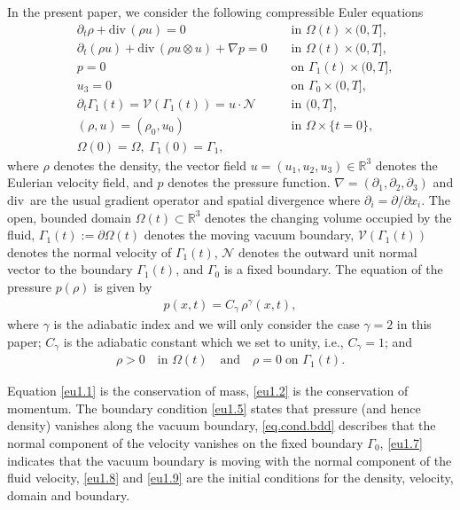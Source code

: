 \documentclass[12pt,twoside,reqno]{amsart}
\numberwithin{equation}{section}
\theoremstyle{definition}
\theoremstyle{remark}
\begin{document}
In the present paper, we consider the following compressible Euler  equations
\begin{subequations}\label{eu1}
  \begin{align}
    &{\partial}_t\rho+{\mathrm{div}\,}(\rho u)=0  &&\text{ in } \Omega(t)\times(0,T],\label{eu1.1}\\
    &{\partial}_t(\rho u)+ {\mathrm{div}\,}(\rho u\otimes u)+{\nabla} p=0  &&\text{ in } \Omega(t)\times(0,T], \label{eu1.2}\\
    &p=0\; &&\text{ on } {\Gamma_1}(t)\times(0,T],\label{eu1.5}\\
    &u_3=0\; &&\text{ on } {\Gamma_0}\times(0,T],\label{eq.cond.bdd}\\
    &\partial_t {\Gamma_1}(t)=\mathcal{V}({\Gamma_1}(t))=u\cdot {\mathcal{N}} &&\text{ in } (0,T],\label{eu1.7}\\
    &(\rho,u)=({\rho_0},u_0) &&\text{ in } \Omega\times\{t=0\} ,\label{eu1.8}\\
    &\Omega(0)=\Omega,\; {\Gamma_1}(0)={\Gamma_1},\label{eu1.9}
\end{align}
\end{subequations}
where $\rho$ denotes the density, the vector field $u=(u_1,u_2,u_3)\in{\mathbb R}^3$ denotes the Eulerian velocity field, and $p$ denotes the pressure function. ${\nabla}=({\partial}_1,{\partial}_2,{\partial}_3)$ and ${\mathrm{div}\,}$ are the usual gradient operator and spatial divergence where ${\partial}_i={\partial}/{\partial} x_i$. The open, bounded domain $\Omega(t)\subset {\mathbb R}^3$ denotes the changing volume occupied by the fluid, ${\Gamma_1}(t):={\partial}\Omega(t)$ denotes the moving vacuum boundary, $\mathcal{V}({\Gamma_1}(t))$ denotes the normal velocity of ${\Gamma_1}(t)$,  ${\mathcal{N}}$ denotes the outward unit normal vector to the boundary ${\Gamma_1}(t)$, and $\Gamma_0$ is a fixed boundary. The equation of the pressure $p(\rho)$ is given by
\begin{align}
  p(x,t)=C_\gamma\, \rho^\gamma(x,t),
\end{align}
where $\gamma$ is the adiabatic index and we will only consider the case $\gamma=2$ in this paper;  $C_\gamma$ is the adiabatic constant which we set to unity, i.e., $C_\gamma=1$; and
\begin{align}
  \rho>0 \quad \text{in } \Omega(t) \quad \text{and}\quad \rho=0 \; \text{on } {\Gamma_1}(t).
\end{align}

Equation \eqref{eu1.1} is the conservation of mass, \eqref{eu1.2} is the conservation of momentum. The boundary condition \eqref{eu1.5} states that pressure (and hence density) vanishes along the vacuum boundary, \eqref{eq.cond.bdd} describes that the normal component of the velocity vanishes on the fixed boundary $\Gamma_0$,  \eqref{eu1.7} indicates that the vacuum boundary is moving with the normal component of the fluid velocity, \eqref{eu1.8} and \eqref{eu1.9} are the initial conditions for the density, velocity, domain and boundary.
\end{document}
